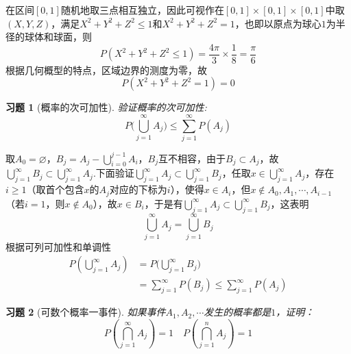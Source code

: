 \documentclass[UTF8,12pt,a4paper,fontset=fandol]{ctexart}
\newtheorem{exercise}{习题}[section]
\begin{document}
\begin{solve}\label{a:Y1.15}
  在区间$[0,1]$随机地取三点相互独立，因此可视作在$[0,1]\times [0,1]\times [0,1]$中取$(X,Y,Z)$，满足$X^2+Y^2+Z^2\leqslant 1$和$X^2+Y^2+Z^2=1$，也即以原点为球心$1$为半径的球体和球面，则
\[
P(X^2+Y^2+Z^2\leqslant 1)=\frac{4\pi}{3}\times\frac{1}{8}=\frac{\pi}{6}
\]
根据几何概型的特点，区域边界的测度为零，故
\[
P(X^2+Y^2+Z^2=1)=0
\]  
\end{solve}

\begin{exercise}[概率的次可加性]\label{q:Y1.17}
验证概率的次可加性:
\[P(\bigcup\limits_{j = 1}^\infty  {{A_j}) \leqslant } \sum\limits_{j = 1}^\infty  {P({A_j})} \]\par{}
\end{exercise}

\begin{solve}\label{a:Y1.17}
取$A_0=\varnothing$，${B_j} = {A_j} - \bigcup\limits_{i = 0}^{j - 1} {{A_i}} $，$B_j$互不相容，由于$B_j\subset A_j$，故$ \bigcup\limits_{j = 1}^\infty  {{B_j}}  \subset \bigcup\limits_{j = 1}^\infty  {{A_j}} $.下面验证$ \bigcup\limits_{j = 1}^\infty  {{A_j}}  \subset \bigcup\limits_{j = 1}^\infty  {{B_j}} $，任取$x\in \bigcup\limits_{j = 1}^\infty  {{A_j}}$，存在$i\geqslant 1$（取首个包含$x$的$A_j$对应的下标为$i$），使得$x\in A_i$，但$x\notin A_0,A_1,\cdots,A_{i-1}$（若$i=1$，则$x\notin A_0$），故$x\in B_i$，于是有$ \bigcup\limits_{j = 1}^\infty  {{A_j}}  \subset \bigcup\limits_{j = 1}^\infty  {{B_j}} $，这表明
\[\bigcup\limits_{j = 1}^\infty  {{A_j}}  = \bigcup\limits_{j = 1}^\infty  {{B_j}}\] 根据可列可加性和单调性
\[\begin{aligned}
P(\bigcup\limits_{j = 1}^\infty  {{A_j}} ) &= P(\bigcup\limits_{j = 1}^\infty  {{B_j})}  \\&= \sum\limits_{j = 1}^\infty  {P({B_j})}  \leqslant \sum\limits_{j = 1}^\infty  {P({A_j})} 
\end{aligned}\]
\end{solve}

\begin{exercise}[可数个概率一事件]\label{q:Y1.18}
如果事件$A_1,A_2,\cdots$发生的概率都是$1$，证明：
\[P(\bigcap\limits_{j = 1}^\infty  {{A_j}} ) = 1\quad P(\bigcap\limits_{j = 1}^n {{A_j}} ) = 1\]\par{}
\end{exercise}
\end{document}
